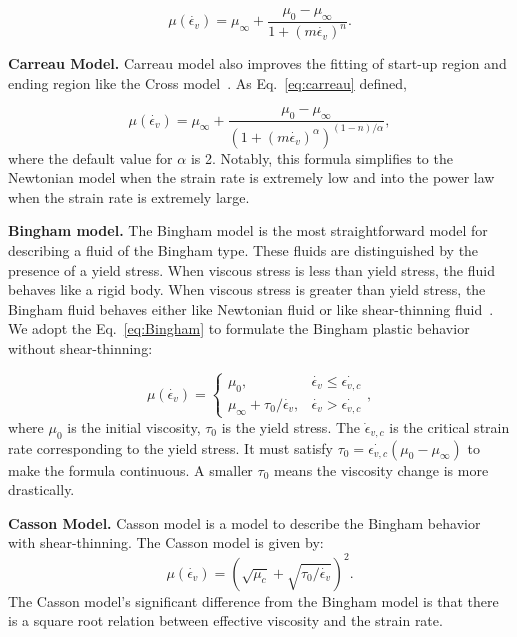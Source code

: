 \documentclass[10pt,journal,compsoc]{IEEEtran}
\begin{document}
\begin{equation}
	\mu(\dot{\epsilon_v})=\mu_{\infty}+\frac{\mu_0-\mu_{\infty}}{1+(m \dot{\epsilon_v})^n}.
	\label{eq:cross}
\end{equation}



\textbf{Carreau Model.}
Carreau model also improves the fitting of start-up region and ending region like the Cross model~\cite{Phan2017}. As Eq.~\ref{eq:carreau} defined,

\begin{equation}
	\mu(\dot{\epsilon_v})=\mu_{\infty}+\frac{\mu_0-\mu_{\infty}}{\left(1+(m \dot{\epsilon_v})^\alpha\right)^{(1-n) / \alpha}}, \label{eq:carreau}
\end{equation}
where the default value for $\alpha$ is 2. Notably, this formula simplifies to the Newtonian model when the strain rate is extremely low and into the power law when the strain rate is extremely large.

\textbf{Bingham model.}
The Bingham model is the most straightforward model for describing a fluid of the Bingham type. These fluids are distinguished by the presence of a yield stress. When viscous stress is less than yield stress, the fluid behaves like a rigid body. When viscous stress is greater than yield stress, the Bingham fluid behaves either like Newtonian fluid or like shear-thinning fluid~\cite{Zhu2015-nonNewton}.
We adopt the Eq.~\ref{eq:Bingham} to formulate the Bingham plastic behavior without shear-thinning:

\begin{equation}
	\mu(\dot{\epsilon_v})= \begin{cases}\mu_0, & \dot{\epsilon_v} \leq \dot{\epsilon_{v,c}} \\ \mu_{\infty}+\tau_0 / \dot{\epsilon_v}, & \dot{\epsilon_v}>\dot{\epsilon_{v,c}}\end{cases}, \label{eq:Bingham}
\end{equation}
where $\mu_0$ is the initial viscosity, $\tau_0$ is the yield stress. The $\dot\epsilon_{v,c}$ is the critical strain rate corresponding to the yield stress. It must satisfy $\tau_0=\dot{\epsilon_{v,c}}\left(\mu_0-\mu_{\infty}\right)$ to make the formula continuous. A smaller $\tau_0$ means the viscosity change is more drastically.


\textbf{Casson Model.}
Casson model is a model to describe the Bingham behavior with shear-thinning. The Casson model is given by:
\begin{equation}
	\mu(\dot{\epsilon_v}) =\left(\sqrt{\mu_c}+\sqrt{ \tau_0 / \dot{\epsilon_v}}\right)^2.  \label{Casson-model}
\end{equation}
The Casson model's significant difference from the Bingham model is that there is a square root relation between effective viscosity and the strain rate.
\end{document}
